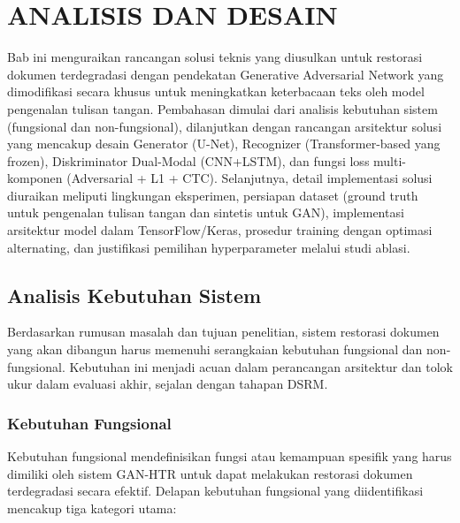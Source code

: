 \documentclass[12pt,a4paper]{article}
\begin{document}
\renewcommand{\thesection}{\Roman{section}}
\renewcommand{\thesubsection}{\thesection.\arabic{subsection}}
\renewcommand{\thesubsubsection}{\thesubsection.\arabic{subsubsection}}
\setcounter{section}{3}
\section{ANALISIS DAN DESAIN}
\label{sec:analisis-desain}

Bab ini menguraikan rancangan solusi teknis yang diusulkan untuk restorasi dokumen terdegradasi dengan pendekatan Generative Adversarial Network yang dimodifikasi secara khusus untuk meningkatkan keterbacaan teks oleh model pengenalan tulisan tangan. Pembahasan dimulai dari analisis kebutuhan sistem (fungsional dan non-fungsional), dilanjutkan dengan rancangan arsitektur solusi yang mencakup desain Generator (U-Net), Recognizer (Transformer-based yang frozen), Diskriminator Dual-Modal (CNN+LSTM), dan fungsi loss multi-komponen (Adversarial + L1 + CTC). Selanjutnya, detail implementasi solusi diuraikan meliputi lingkungan eksperimen, persiapan dataset (ground truth untuk pengenalan tulisan tangan dan sintetis untuk GAN), implementasi arsitektur model dalam TensorFlow/Keras, prosedur training dengan optimasi alternating, dan justifikasi pemilihan hyperparameter melalui studi ablasi.

\subsection{Analisis Kebutuhan Sistem} %

Berdasarkan rumusan masalah dan tujuan penelitian, sistem restorasi dokumen yang akan dibangun harus memenuhi serangkaian kebutuhan fungsional dan non-fungsional. Kebutuhan ini menjadi acuan dalam perancangan arsitektur dan tolok ukur dalam evaluasi akhir, sejalan dengan tahapan DSRM.

\subsubsection{Kebutuhan Fungsional} %

Kebutuhan fungsional mendefinisikan fungsi atau kemampuan spesifik yang harus dimiliki oleh sistem GAN-HTR untuk dapat melakukan restorasi dokumen terdegradasi secara efektif. Delapan kebutuhan fungsional yang diidentifikasi mencakup tiga kategori utama:
\end{document}

